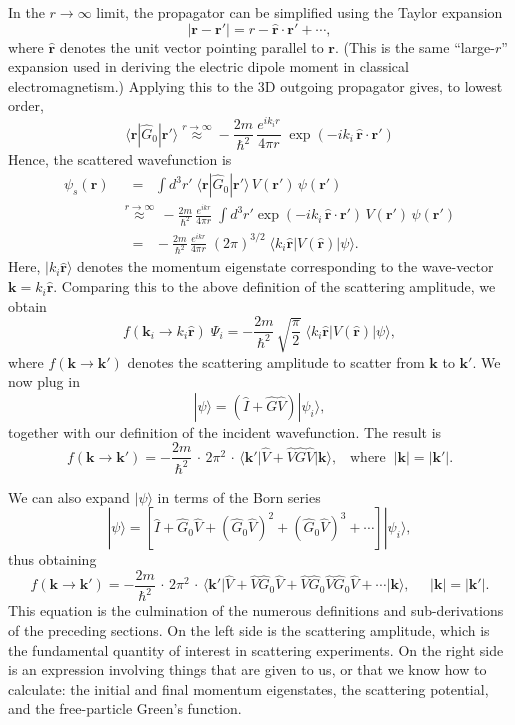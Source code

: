\documentclass[pra,12pt]{revtex4}
\begin{document}
In the $r\rightarrow\infty$ limit, the propagator can be simplified
using the Taylor expansion
$$|\mathbf{r} - \mathbf{r}'| = r - \hat{\mathbf{r}} \cdot \mathbf{r}' + \cdots,$$
where $\hat{\mathbf{r}}$ denotes the unit vector pointing parallel to
$\mathbf{r}$.  (This is the same ``large-$r$'' expansion used in
deriving the electric dipole moment in classical electromagnetism.)
Applying this to the 3D outgoing propagator gives, to lowest order,
$$\langle\mathbf{r}|\hat{G}_0|\mathbf{r}'\rangle \overset{r\rightarrow\infty}{\approx} - \frac{2m}{\hbar^2}\, \frac{e^{ik_ir}}{4\pi r}\; \exp\left(-ik_i \, \hat{\mathbf{r}} \cdot \mathbf{r}'\right)$$
Hence, the scattered wavefunction is
$$\begin{aligned}\psi_s(\mathbf{r}) &\;\;= \;\; \int d^3r'\; \langle\mathbf{r}|\hat{G}_0|\mathbf{r}'\rangle\, V(\mathbf{r}')\, \psi(\mathbf{r}') \\ &\overset{r\rightarrow\infty}{\approx} \, - \frac{2m}{\hbar^2} \, \frac{e^{ikr}}{4\pi r}\; \int d^3r' \exp\left(-ik_i \, \hat{\mathbf{r}} \cdot \mathbf{r}'\right)\, V(\mathbf{r}')\, \psi(\mathbf{r}') \\ &\;\;=\;\; - \frac{2m}{\hbar^2} \, \frac{e^{ikr}}{4\pi r} \; (2\pi)^{3/2} \; \big\langle k_i \hat{\mathbf{r}} \big|V(\hat{\mathbf{r}})\big|\psi\big\rangle. \end{aligned}$$
Here, $|k_i\hat{\mathbf{r}} \rangle$ denotes the momentum eigenstate
corresponding to the wave-vector $\mathbf{k} = k_i \hat{\mathbf{r}}$.
Comparing this to the above definition of the scattering amplitude, we
obtain
$$f(\mathbf{k}_i\rightarrow k_i\hat{\mathbf{r}} )\; \Psi_i = - \frac{2m}{\hbar^2} \,\sqrt{\frac{\pi}{2}} \; \big\langle k_i \hat{\mathbf{r}} \big|V(\hat{\mathbf{r}})\big|\psi\big\rangle,$$
where $f(\mathbf{k}\rightarrow \mathbf{k}')$ denotes the scattering
amplitude to scatter from $\mathbf{k}$ to $\mathbf{k}'$.  We now
plug in
$$|\psi\rangle = \left(\hat{I} + \hat{G}\hat{V}\right)|\psi_i\rangle,$$
together with our definition of the incident wavefunction.  The result
is
$$f(\mathbf{k}\rightarrow \mathbf{k}') = - \frac{2m}{\hbar^2} \,\cdot \, 2\pi^2 \,\cdot\, \big\langle \mathbf{k}'\big| \hat{V} + \hat{V}\hat{G} \hat{V} \big|\mathbf{k}\big\rangle, \;\;\;\mathrm{where} \;\; |\mathbf{k}| = |\mathbf{k}'|.$$

We can also expand $|\psi\rangle$ in terms of the Born series
$$|\psi\rangle = \left[\hat{I} + \hat{G}_0 \hat{V} + (\hat{G}_0 \hat{V})^2 + (\hat{G}_0 \hat{V})^3 + \cdots\right]|\psi_i\rangle,$$
thus obtaining
$$\boxed{\;\;\;f(\mathbf{k}\rightarrow \mathbf{k}') = - \frac{2m}{\hbar^2} \,\cdot \, 2\pi^2 \,\cdot\, \big\langle \mathbf{k}'\big| \hat{V} + \hat{V}\hat{G}_0 \hat{V} + \hat{V} \hat{G}_0 \hat{V} \hat{G}_0\hat{V} + \cdots \big|\mathbf{k}\big\rangle, \;\;\; \;\; |\mathbf{k}| = |\mathbf{k}'|.\;\;\;}$$
This equation is the culmination of the numerous definitions and
sub-derivations of the preceding sections.  On the left side is the
scattering amplitude, which is the fundamental quantity of interest in
scattering experiments.  On the right side is an expression involving
things that are given to us, or that we know how to calculate: the
initial and final momentum eigenstates, the scattering potential, and
the free-particle Green's function.
\end{document}
